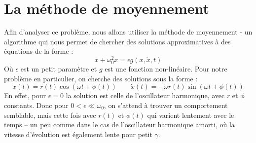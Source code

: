 \section{La méthode de moyennement}
%
Afin d'analyser ce problème, nous allons utiliser la méthode de 
moyennement \cite{rand_lecture_2012} - un algorithme %
qui nous permet de chercher des solutions approximatives à des équations de la forme :
\begin{equation}
    \ddot{x} + \omega_0^2 x = \epsilon g(x, \dot{x}, t)
\end{equation}
Où $\epsilon$ est un petit paramètre et $g$ est une fonction non-linéaire. Pour notre problème en particulier, on cherche des solutions sous la forme :
\begin{equation}
x(t) = r(t)\cos(\omega t + \phi(t)) \qquad \dot{x}(t) =  -\omega r(t)\sin(\omega t + \phi(t))
\label{eq:duff_x_xdot}
\end{equation}
%
En effet, pour $\epsilon=0$ la solution est celle de l'oscillateur harmonique, avec $r$ et $\phi$ constants.
Donc pour $0 < \epsilon \ll \omega_0$, on s'attend à trouver un comportement semblable, mais cette fois avec $r(t)$ et $\phi(t)$ 
qui varient lentement avec le temps – un peu comme dans le cas de l'oscillateur harmonique amorti, où la vitesse d'évolution est également lente pour petit $\gamma$.
%

